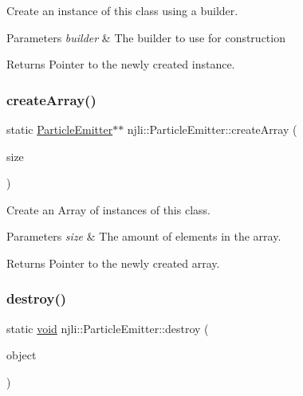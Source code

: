 Create an instance of this class using a builder.


\begin{DoxyParams}{Parameters}
{\em builder} & The builder to use for construction\\
\hline
\end{DoxyParams}
\begin{DoxyReturn}{Returns}
Pointer to the newly created instance. 
\end{DoxyReturn}
\mbox{\label{classnjli_1_1_particle_emitter_a6449de8d6806afbcd8f06c9810bd8e1c}} 
\subsubsection{\texorpdfstring{create\+Array()}{createArray()}}
{\footnotesize\ttfamily static \mbox{\hyperlink{classnjli_1_1_particle_emitter}{Particle\+Emitter}}$\ast$$\ast$ njli\+::\+Particle\+Emitter\+::create\+Array (\begin{DoxyParamCaption}\item[{const \mbox{\hyperlink{_util_8h_a10e94b422ef0c20dcdec20d31a1f5049}{u32}}}]{size }\end{DoxyParamCaption})\hspace{0.3cm}{\ttfamily [static]}}

Create an Array of instances of this class.


\begin{DoxyParams}{Parameters}
{\em size} & The amount of elements in the array.\\
\hline
\end{DoxyParams}
\begin{DoxyReturn}{Returns}
Pointer to the newly created array. 
\end{DoxyReturn}
\mbox{\label{classnjli_1_1_particle_emitter_a0c36e01f2a6c172eefafbaca5f328a5f}} 
\subsubsection{\texorpdfstring{destroy()}{destroy()}}
{\footnotesize\ttfamily static \mbox{\hyperlink{_thread_8h_af1e856da2e658414cb2456cb6f7ebc66}{void}} njli\+::\+Particle\+Emitter\+::destroy (\begin{DoxyParamCaption}\item[{\mbox{\hyperlink{classnjli_1_1_particle_emitter}{Particle\+Emitter}} $\ast$}]{object }\end{DoxyParamCaption})\hspace{0.3cm}{\ttfamily [static]}}

